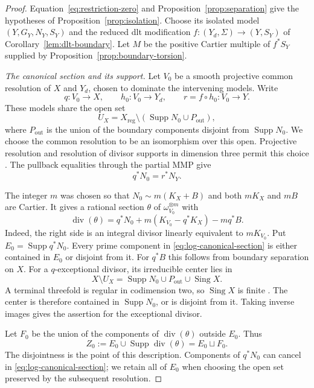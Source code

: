 \begin{proof}
Equation~\eqref{eq:restriction-zero} and
Proposition~\ref{prop:separation} give the hypotheses of
Proposition~\ref{prop:isolation}. Choose its isolated model
$(Y,G_Y,N_Y,S_Y)$ and the reduced dlt modification
$f:(Y_d,\Sigma)\to(Y,S_Y)$ of Corollary~\ref{lem:dlt-boundary}.
Let $M$ be the positive Cartier multiple of $f^*S_Y$ supplied by
Proposition~\ref{prop:boundary-torsion}.

\emph{The canonical section and its support.}
Let $V_0$ be a smooth projective common resolution of $X$ and $Y_d$,
chosen to dominate the intervening models.  Write
\[
 q:V_0\longrightarrow X,\qquad h_0:V_0\longrightarrow Y_d,
 \qquad r=f\circ h_0:V_0\longrightarrow Y.
\]
These models share the open set
\[
 U_X=X_{\mathrm{reg}}\setminus
       (\operatorname{Supp}N_0\cup P_{\mathrm{out}}),
\]
where $P_{\mathrm{out}}$ is the union of the boundary components
disjoint from $\operatorname{Supp}N_0$.  We choose the common
resolution to be an isomorphism over this open.  Projective resolution
and resolution of divisor supports in dimension three permit this
choice \cite{CP,CJS}.  The pullback equalities through the partial
MMP give
\begin{equation}\label{eq:cycle-common-pullbacks}
 q^*N_0=r^*N_Y.
\end{equation}

The integer $m$ was chosen so that
$N_0\sim m(K_X+B)$ and both $mK_X$ and $mB$ are Cartier.  It gives a
rational section $\theta$ of $\omega_{V_0}^{\otimes m}$ with
\begin{equation}\label{eq:log-canonical-section}
 \operatorname{div}(\theta)
   =q^*N_0+m(K_{V_0}-q^*K_X)-m q^*B.
\end{equation}
Indeed, the right side is an integral divisor linearly equivalent to
$mK_{V_0}$.  Put $E_0=\operatorname{Supp}q^*N_0$.  Every prime
component in \eqref{eq:log-canonical-section} is either contained in
$E_0$ or disjoint from it.  For $q^*B$ this follows from boundary
separation on $X$.  For a $q$-exceptional divisor, its irreducible
center lies in
\[
 X\setminus U_X
   =\operatorname{Supp}N_0\cup P_{\mathrm{out}}
       \cup\operatorname{Sing}X.
\]
A terminal threefold is regular in codimension two, so
$\operatorname{Sing}X$ is finite
\cite[Lemma~2.3]{Companion}.  The center is therefore contained in
$\operatorname{Supp}N_0$, or is disjoint from it.  Taking inverse
images gives the assertion for the exceptional divisor.

Let $F_0$ be the union of the components of
$\operatorname{div}(\theta)$ outside $E_0$.  Thus
\begin{equation}\label{eq:cover-closed-set}
 Z_0:=E_0\cup\operatorname{Supp}\operatorname{div}(\theta)
          =E_0\sqcup F_0.
\end{equation}
The disjointness is the point of this description.  Components of
$q^*N_0$ can cancel in \eqref{eq:log-canonical-section}; we retain all
of $E_0$ when choosing the open set preserved by the subsequent
resolution.


\end{proof}
